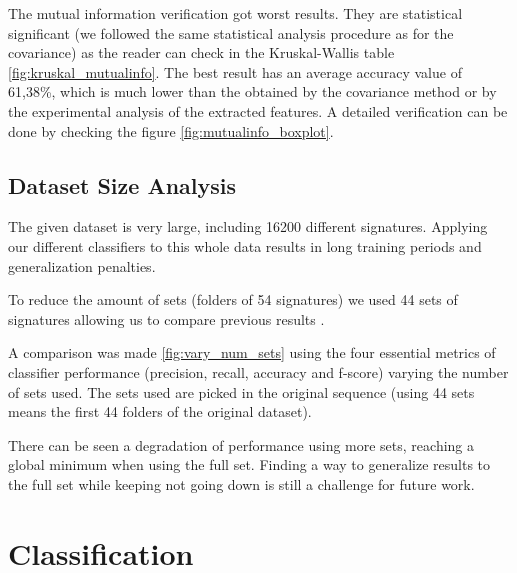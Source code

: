 \documentclass[12pt,a4paper]{report}
\begin{document}

	The mutual information verification got worst results. They are statistical significant (we followed the same statistical analysis procedure as for the covariance) as the reader can check in the Kruskal-Wallis table \ref{fig:kruskal_mutualinfo}. The best result has an average accuracy value of 61,38\%, which is much lower than the obtained by the covariance method or by the experimental analysis of the extracted features. A detailed verification can be done by checking the figure \ref{fig:mutualinfo_boxplot}.
	
				
		\section{Dataset Size Analysis}
		
			The given dataset is very large, including 16200 different signatures. Applying our different classifiers to this whole data results in long training periods and generalization penalties.
			
			To reduce the amount of sets (folders of 54 signatures) we used 44 sets of signatures allowing us to compare previous results \cite{armand07}.
			
			A comparison was made \ref{fig:vary_num_sets} using the four essential metrics of classifier performance (precision, recall, accuracy and f-score) varying the number of sets used. The sets used are picked in the original sequence (using 44 sets means the first 44 folders of the original dataset).
			
			
			There can be seen a degradation of performance using more sets, reaching a global minimum when using the full set. Finding a way to generalize results to the full set while keeping not going down is still a challenge for future work.
				
		\chapter{Classification}
		\label{sec:classification}
\end{document}
